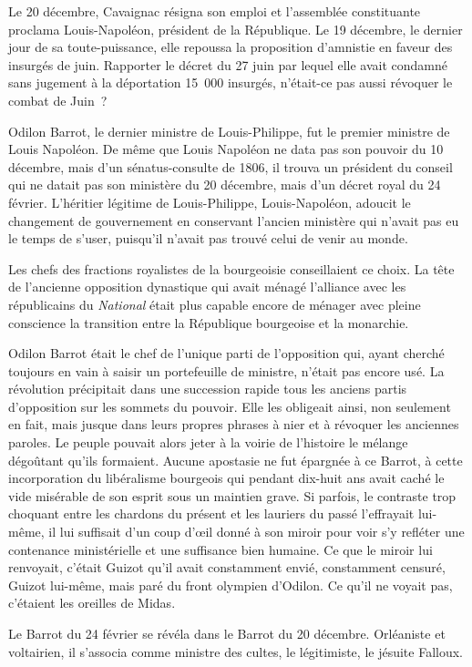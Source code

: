 \documentclass[twoside]{book} %
\begin{document}
Le 20 décembre, Cavaignac résigna son emploi et l’assemblée constituante proclama Louis-Napoléon, président de la République. Le 19 décembre, le dernier jour de sa toute-puissance, elle repoussa la proposition d’amnistie en faveur des insurgés de juin. Rapporter le décret du 27 juin par lequel elle avait condamné sans jugement à la déportation 15 000 insurgés, n’était-ce pas aussi révoquer le combat de Juin ?\par
Odilon Barrot, le dernier ministre de Louis-Philippe, fut le premier ministre de Louis Napoléon. De même que Louis Napoléon ne data pas son pouvoir du 10 décembre, mais d’un sénatus-consulte de 1806, il trouva un président du conseil qui ne datait pas son ministère du 20 décembre, mais d’un décret royal du 24 février. L’héritier légitime de Louis-Philippe, Louis-Napoléon, adoucit le changement de gouvernement en conservant l’ancien ministère qui n’avait pas eu le temps de s’user, puisqu’il n’avait pas trouvé celui de venir au monde.\par
Les chefs des fractions royalistes de la bourgeoisie conseillaient ce choix. La tête de l’ancienne opposition dynastique qui avait ménagé l’alliance avec les républicains du \emph{National} était plus capable encore de ménager avec pleine conscience la transition entre la République bourgeoise et la monarchie.\par
Odilon Barrot était le chef de l’unique parti de l’opposition qui, ayant cherché toujours en vain à saisir un portefeuille de ministre, n’était pas encore usé. La révolution précipitait dans une succession rapide tous les anciens partis d’opposition sur les sommets du pouvoir. Elle les obligeait ainsi, non seulement en fait, mais jusque dans leurs propres phrases à nier et à révoquer les anciennes paroles. Le peuple pouvait alors jeter à la voirie de l’histoire le mélange dégoûtant qu’ils formaient. Aucune apostasie ne fut épargnée à ce Barrot, à cette incorporation du libéralisme bourgeois qui pendant dix-huit ans avait caché le vide misérable de son esprit sous un maintien grave. Si parfois, le contraste trop choquant entre les chardons du présent et les lauriers du passé l’effrayait lui-même, il lui suffisait d’un coup d’œil donné à son miroir pour voir s’y refléter une contenance ministérielle et une suffisance bien humaine. Ce que le miroir lui renvoyait, c’était Guizot qu’il avait constamment envié, constamment censuré, Guizot lui-même, mais paré du front olympien d’Odilon. Ce qu’il ne voyait pas, c’étaient les oreilles de Midas.\par
Le Barrot du 24 février se révéla dans le Barrot du 20 décembre. Orléaniste et voltairien, il s’associa comme ministre des cultes, le légitimiste, le jésuite Falloux.\par
\end{document}
